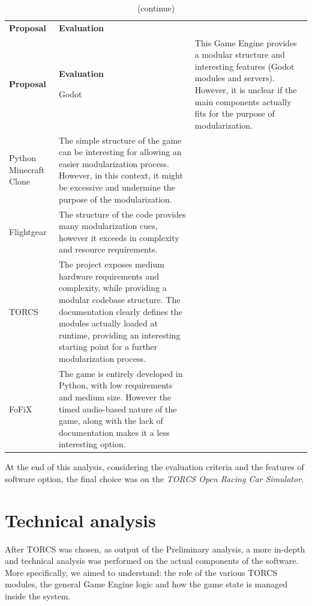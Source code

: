 
\newcommand{\coloredTableHead}{\rowcolor[HTML]{b61827}}
\newcommand{\lightTableRow}{\rowcolor{lightRowColor}}
\newcommand{\darkTableRow}{\rowcolor{darkRowColor}}

\def\arraystretch{1.75}
\begin{longtable}{ 
		>{\centering}p{} 
		>{}p{}}
	
	\caption{Summary of the analysis} \\
	\coloredTableHead
	\textbf{\color{white}Proposal} & 
	\centering\textbf{\color{white}Evaluation}
	\endfirsthead
	
	\caption[]{(continue)}\\
	\coloredTableHead 
	\textbf{\color{white}Proposal} &
	\centering\textbf{\color{white}Evaluation}
	\endhead
	
	Godot & This Game Engine provides a modular structure and interesting features (Godot modules and servers). However, it is unclear if the main components actually fits for the purpose of modularization. \\
	Python Minecraft Clone & The simple structure of the game can be interesting for allowing an easier modularization process. However, in this context, it might be excessive and undermine the purpose of the modularization. \\
	Flightgear & The structure of the code provides many modularization cues, however it exceeds in complexity and resource requirements. \\
	TORCS & The project exposes medium hardware requirements and complexity, while providing a modular codebase structure. The documentation clearly defines the modules actually loaded at runtime, providing an interesting starting point for a further modularization process. \\
	FoFiX & The game is entirely developed in Python, with low requirements and medium size. However the timed audio-based nature of the game, along with the lack of documentation makes it a less interesting option.
\end{longtable}
At the end of this analysis, considering the evaluation criteria and the features of software option, the final choice was on the \textit{TORCS Open Racing Car Simulator}.

\section{Technical analysis}
After TORCS was chosen, as output of the Preliminary analysis, a more in-depth and technical analysis was performed on the actual components of the software. More specifically, we aimed to understand: the role of the various TORCS modules, the general Game Engine logic and how the game state is managed inside the system.

